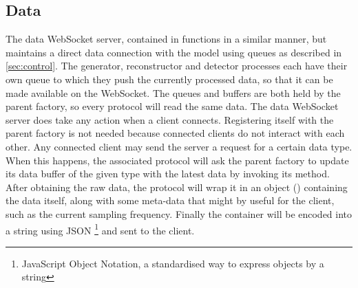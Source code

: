 \documentclass[a4paper, openany, oneside]{memoir}
\begin{document}
\subsection{Data}
\label{sub:websocket_data}
The data WebSocket server, contained in  functions in a similar manner, but maintains a direct data connection with the model using queues as described in \cref{sec:control}. The generator, reconstructor and detector processes each have their own queue to which they push the currently processed data, so that it can be made available on the WebSocket. The queues and buffers are both held by the parent factory, so every protocol will read the same data.
The data WebSocket server does take any action when a client connects. Registering itself with the parent factory is not needed because connected clients do not interact with each other.
Any connected client may send the server a request for a certain data type. When this happens, the associated protocol will ask the parent factory to update its data buffer of the given type with the latest data by invoking its  method. After obtaining the raw data, the protocol will wrap it in an object () containing the data itself, along with some meta-data that might by useful for the client, such as the current sampling frequency. Finally the container will be encoded into a string using JSON \footnote{JavaScript Object Notation, a standardised way to express objects by a string} and sent to the client.
\end{document}
